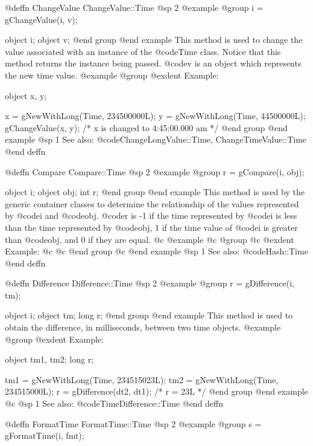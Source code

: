 @deffn {ChangeValue} ChangeValue::Time
@sp 2
@example
@group
i = gChangeValue(i, v);

object  i;
object  v;
@end group
@end example
This method is used to change the value associated with an instance of
the @code{Time} class.  Notice that this method returns the instance
being passed.  @code{v} is an object which represents the new time value.
@example
@group
@exdent Example:

object  x, y;

x = gNewWithLong(Time, 234500000L);
y = gNewWithLong(Time, 44500000L);
gChangeValue(x, y);    /*  x is changed to 4:45:00.000 am  */
@end group
@end example
@sp 1
See also:  @code{ChangeLongValue::Time, ChangeTimeValue::Time}
@end deffn










@deffn {Compare} Compare::Time
@sp 2
@example
@group
r = gCompare(i, obj);

object  i;
object  obj;
int     r;
@end group
@end example
This method is used by the generic container classes to determine
the relationship of the values represented by @code{i} and @code{obj}. 
@code{r} is -1 if the time represented by @code{i} is less than
the time represented by @code{obj}, 1 if the time value of @code{i}
is greater than @code{obj}, and 0 if they are equal.
@c @example
@c @group
@c @exdent Example:
@c
@c @end group
@c @end example
@sp 1
See also:  @code{Hash::Time}
@end deffn







@deffn {Difference} Difference::Time
@sp 2
@example
@group
r = gDifference(i, tm);

object  i;
object  tm;
long    r;
@end group
@end example
This method is used to obtain the difference, in milliseconds,
between two time objects.  
@example
@group
@exdent Example:

object  tm1, tm2;
long    r;

tm1 = gNewWithLong(Time, 234515023L);
tm2 = gNewWithLong(Time, 234515000L);
r = gDifference(dt2, dt1);    /*  r = 23L  */
@end group
@end example
@c @sp 1
See also:  @code{TimeDifference::Time}
@end deffn







@deffn {FormatTime} FormatTime::Time
@sp 2
@example
@group
s = gFormatTime(i, fmt);

